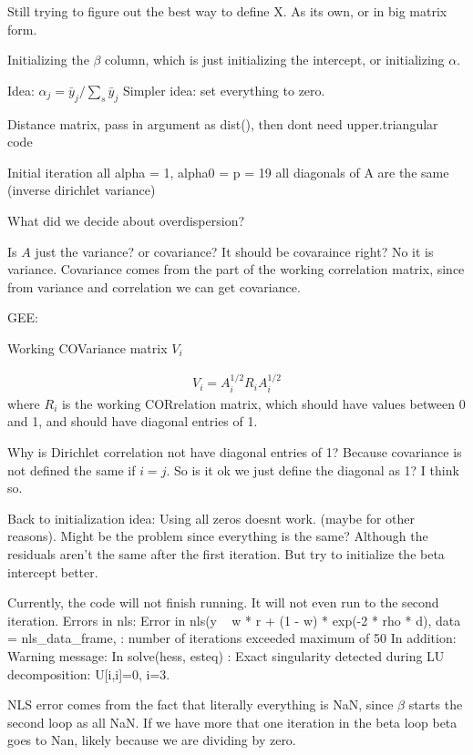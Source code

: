 \documentclass[10pt]{article}
\begin{document}
Still trying to figure out the best way to define X. As its own, or in big matrix form.


Initializing the $\beta$ column, which is just initializing the intercept, or initializing $\alpha$.

Idea: $\alpha_j = \bar y_j/ \sum_s \bar y_j$
Simpler idea: set everything to zero.

Distance matrix, pass in argument as dist(), then dont need upper.triangular code

Initial iteration
all alpha = 1, alpha0 = p = 19
all diagonals of A are the same (inverse dirichlet variance)

What did we decide about overdispersion?

Is $A$ just the variance? or covariance? It should be covaraince right? No it is variance. Covariance comes from the part of the working correlation matrix, since from variance and correlation we can get covariance.


GEE:

Working COVariance matrix $V_i$

\begin{align*}
  V_i = A_i^{1/2}R_i A_i^{1/2}
\end{align*}
where $R_i$ is the working CORrelation matrix, which should have values between 0 and 1, and should have diagonal entries of 1.


Why is Dirichlet correlation not have diagonal entries of 1? Because covariance is not defined the same if $i = j$. So is it ok we just define the diagonal as 1? I think so.


Back to initialization idea: Using all zeros doesnt work. (maybe for other reasons). Might be the problem since everything is the same? Although the residuals aren't the same after the first iteration. But try to initialize the beta intercept better.


Currently, the code will not finish running. It will not even run to the second iteration. Errors in nls:
Error in nls(y ~ w * r + (1 - w) * exp(-2 * rho * d), data = nls\_data\_frame,  :
  number of iterations exceeded maximum of 50
In addition: Warning message:
In solve(hess, esteq) :
  Exact singularity detected during LU decomposition: U[i,i]=0, i=3.


NLS error comes from the fact that literally everything is NaN, since $\beta$ starts the second loop as all NaN.
If we have more that one iteration in the beta loop beta goes to Nan, likely because we are dividing by zero.
\end{document}
